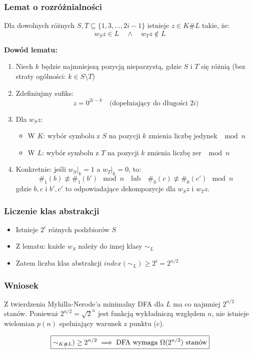 \documentclass{article}
\theoremstyle{definition}
\theoremstyle{remark}
\begin{document}
\subsubsection{Lemat o rozróżnialności}
Dla dowolnych różnych $S, T \subseteq \{1,3,\dots,2i-1\}$ istnieje \(z \in K \# L\) takie, że:
\[
w_S z \in L \quad \land \quad w_T z \notin L
\]

\textbf{Dowód lematu:}
\begin{enumerate}
    \item Niech $k$ będzie najmniejszą pozycją nieparzystą, gdzie $S$ i $T$ się różnią (bez straty ogólności: $k \in S \setminus T$)
    
    \item Zdefiniujmy sufiks:
    \[
    z = 0^{2i - k} \quad \text{(dopełniający do długości $2i$)}
    \]
    
    \item Dla $w_S z$:
    \begin{itemize}
        \item W $K$: wybór symbolu z $S$ na pozycji $k$ zmienia liczbę jedynek $\mod n$
        \item W $L$: wybór symbolu z $T$ na pozycji $k$ zmienia liczbę zer $\mod n$
    \end{itemize}
    
    \item Konkretnie: jeśli $w_S|_k = 1$ a $w_T|_k = 0$, to:
    \[
    \#_1(b) \not\equiv \#_1(b') \mod n \quad \text{lub} \quad \#_0(c) \not\equiv \#_0(c') \mod n
    \]
    gdzie $b,c$ i $b',c'$ to odpowiadające dekompozycje dla $w_S z$ i $w_T z$.
\end{enumerate}

\subsubsection{Liczenie klas abstrakcji}
\begin{itemize}
    \item Istnieje $2^i$ różnych podzbiorów $S$
    \item Z lematu: każde $w_S$ należy do innej klasy $\sim_L$
    \item Zatem liczba klas abstrakcji $index(\sim_L) \geq 2^i = 2^{n/2}$
\end{itemize}

\subsubsection{Wniosek}
Z twierdzenia Myhilla-Nerode’a minimalny DFA dla $L$ ma co najmniej $2^{n/2}$ stanów. Ponieważ $2^{n/2} = \sqrt{2}^n$ jest funkcją wykładniczą względem $n$, nie istnieje wielomian $p(n)$ spełniający warunek z punktu (c).

\[
\boxed{\index(\sim_{K\#L}) \geq 2^{n/2} \implies \text{DFA wymaga } \Omega(2^{n/2}) \text{ stanów}}
\]
\end{document}
